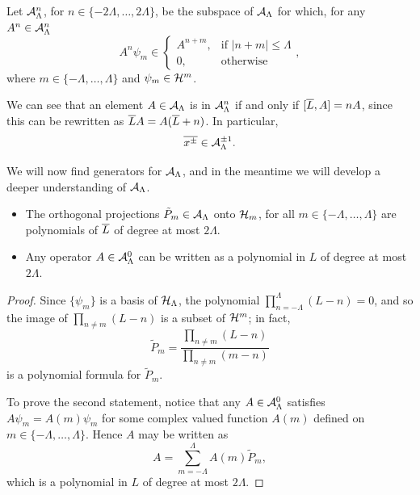 \begin{definition}\label{definitionGradingOperatorsD2Cut}
Let $\mathcal A^n_\Lambda$, for $n \in \{-2\Lambda, \dots, 2\Lambda\}$, be the subspace of $\mathcal A_\Lambda$ for which, for any $A^n \in \mathcal A^n_\Lambda$
\begin{equation*}
    A^n \psi_m \in 
    \begin{cases}
        A^{n+m},& \text{if } |n+m| \leq \Lambda\\
        0, & \text{otherwise}
    \end{cases},
\end{equation*}
where $m \in \{-\Lambda, \dots, \Lambda\}$ and $\psi_m \in \mathcal H^m$.
\end{definition}

We can see that an element $A \in \mathcal A_\Lambda$ is in $\mathcal A^n_\Lambda$ if and only if $[\overline{L}, A] = nA$, since this can be rewritten as $\overline{L} A = A(\overline{L} + n)$. In particular, 
\begin{equation}\label{equationXPMGradeUpDownD2}
    \overline{x^\pm} \in \mathcal A^{\pm 1}_\Lambda.
\end{equation}

\lin

We will now find generators for $\mathcal A_\Lambda$, and in the meantime we will develop a deeper understanding of $\mathcal A_\Lambda$.

\begin{proposition}\label{propositionAboutLProjectorsGeneralFunctionD2}
\hfill
    \begin{itemize}
    
    \item The orthogonal projections $\tilde P_m \in \mathcal A_\Lambda$ onto $\mathcal H_m$, for all $m \in \{-\Lambda, \dots, \Lambda\}$ are polynomials of $\overline{L}$ of degree at most $2 \Lambda$.
    
    \item Any operator $A \in \mathcal A^0_\Lambda$ can be written as a polynomial in $L$ of degree at most $2\Lambda$.
    
    \end{itemize}
\end{proposition}
\begin{proof}
Since $\{\psi_m\}$ is a basis of $\mathcal H_\Lambda$, the polynomial $\prod_{n = -\Lambda}^\Lambda (L - n) = 0$, and so the image of $\prod_{n \neq m} (L - n)$ is a subset of $\mathcal H^m$; in fact,
\begin{equation}\label{equationFormulaProjectionTildemD2}
    \tilde P_m = \frac{\prod_{n \neq m} (L - n)}{\prod_{n \neq m} (m - n)}
\end{equation}
is a polynomial formula for $\tilde P_m$.

To prove the second statement, notice that any $A \in \mathcal A^0_\Lambda$ satisfies $A \psi_m = A(m) \psi_m$ for some complex valued function $A(m)$ defined on $m \in \{-\Lambda, \dots, \Lambda\}$. Hence $A$ may be written as 
\begin{equation}
    A = \sum_{m = -\Lambda}^\Lambda A(m) \tilde P_m,
\end{equation} 
which is a polynomial in $L$ of degree at most $2\Lambda$.
\end{proof}

